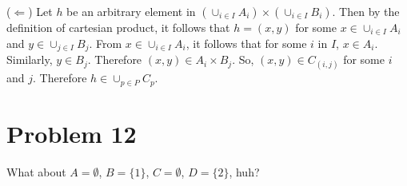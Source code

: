 \documentclass{article}
\begin{document}
($\Leftarrow$) Let $h$ be an arbitrary element in $(\cup_{i \in I}A_i)
\times (\cup_{i \in I}B_i)$. Then by the definition of cartesian
product, it follows that $h = (x,y)$ for some $x \in \cup_{i \in
  I}A_i$ and $y \in \cup_{j \in I}B_j$. From $x \in \cup_{i \in
  I}A_i$, it follows that for some $i$ in $I$, $x \in A_i$. Similarly,
$y \in B_j$. Therefore $(x,y) \in A_i \times B_j$. So, $(x,y) \in
C_{(i,j)}$ for some $i$ and $j$. Therefore $h \in \cup_{p \in P}C_p$.

\section{Problem 12}

What about $A = \emptyset $, $B = \{1\}$, $C = \emptyset$, $D =
\{2\}$, huh?
\end{document}
